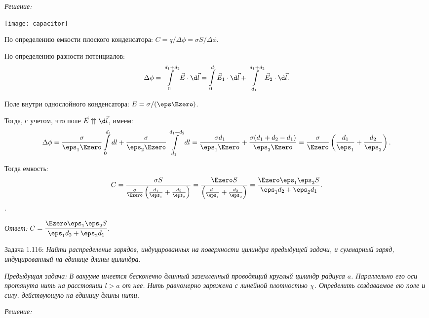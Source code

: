 \vspace*{2em}
\emph{Решение:}

\begin{minipage}{.4\textwidth}
    \texttt{[image: capacitor]}
\end{minipage}
\begin{minipage}{.55\textwidth}
По определению емкости плоского конденсатора:
\( C = q/\Delta\phi = \sigma S/\Delta\phi \).

По определению разности потенциалов:
\[
    \Delta\phi = \int\limits_0^{d_1 + d_2} \vec{E}\cdot\d\vec{l} =
    \int\limits_0^{d_1} \vec{E}_1\cdot\d\vec{l} +
    \int\limits_{d_1}^{d_1 + d_2} \vec{E}_2\cdot\d\vec{l}.
\]

Поле внутри однослойного конденсатора: \( E = \sigma/(\eps\Ezero) \).
\end{minipage}

Тогда, с учетом, что поле \( \vec{E} \uparrow\!\uparrow \d\vec{l} \), имеем:
\[
    \Delta\phi = \frac{\sigma}{\eps_1\Ezero}\int\limits_0^{d_1} dl +
    \frac{\sigma}{\eps_2\Ezero}\int\limits_{d_1}^{d_1 + d_2} dl =
    \frac{\sigma d_1}{\eps_1\Ezero} +
    \frac{\sigma (d_1 + d_2 - d_1)}{\eps_2\Ezero} =
    \frac{\sigma}{\Ezero}\left(\frac{d_1}{\eps_1} + \frac{d_2}{\eps_2}\right).
\]

Тогда емкость:
\[
    C = \frac{\sigma S}{\frac{\sigma}{\Ezero}
    \left(\frac{d_1}{\eps_1} + \frac{d_2}{\eps_2}\right)} =
    \frac{\Ezero S}{\left(\frac{d_1}{\eps_1} + \frac{d_2}{\eps_2}\right)} =
    \frac{\Ezero\eps_1\eps_2 S}{\eps_1d_2 + \eps_2d_1}.
\].

\emph{Ответ:} \( C = \cfrac{\Ezero\eps_1\eps_2 S}{\eps_1d_2 + \eps_2d_1} \).

\pagebreak
Задача 1.116: \emph{Найти распределение зарядов, индуцированных на поверхности
цилиндра предыдущей задачи, и суммарный заряд, индуцированный на единице длины
цилиндра.}
\vspace*{-1em}

\singlespacing
{\footnotesize\emph{Предыдущая задача: В вакууме имеется бесконечно длинный заземленный
проводящий круглый цилиндр радиуса \( a \). Параллельно его оси протянута нить на
расстоянии \( l > a \) от нее. Нить равномерно заряжена с линейной плотностью
\( \chi \). Определить создаваемое ею поле и силу, действующую на единицу длины
нити.}}

\vspace*{1em}
\onehalfspacing
\emph{Решение:}

